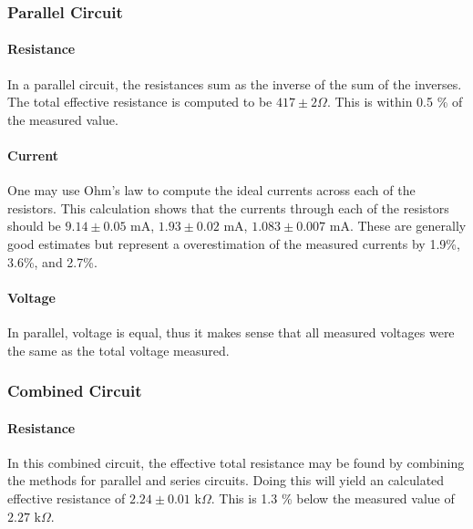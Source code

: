 \documentclass[11pt]{article}
\begin{document}
\subsubsection{Parallel Circuit} 
\paragraph{Resistance}
In a parallel circuit, the resistances sum as the inverse of the sum of the inverses. The total effective resistance is computed to be \(417 \pm 2 \Omega\). This is within 0.5 \% of the measured value.
\paragraph{Current}
One may use Ohm's law to compute the ideal currents across each of the resistors. This calculation shows that the currents through each of the resistors should be \(9.14 \pm 0.05 \) mA, \(1.93 \pm 0.02 \) mA, \(1.083 \pm 0.007 \) mA. These are generally good estimates but represent a overestimation of the measured currents by 1.9\%, 3.6\%, and 2.7\%.

\paragraph{Voltage}
In parallel, voltage is equal, thus it makes sense that all measured voltages were the same as the total voltage measured. 

\subsubsection{Combined Circuit} 
\paragraph{Resistance}
In this combined circuit, the effective total resistance may be found by combining the methods for parallel and series circuits. Doing this will yield an calculated effective resistance of \( 2.24 \pm 0.01 \) k\(\Omega\). This is 1.3 \% below the measured value of \( 2.27\) k\(\Omega\).
\end{document}
